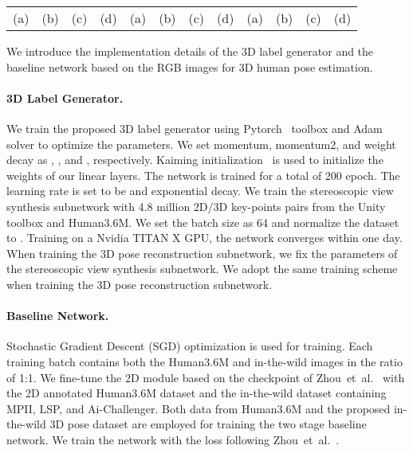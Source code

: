\documentclass[10pt,twocolumn,letterpaper]{article}
\def\etal{et~al.\xspace}
\begin{document}
\begin{figure*}[t]
\begin{center}
{\begin{tabular}{cccccccccccc}
 (a)& (b)& (c)& (d)& (a)& (b)& (c)& (d)& (a)& (b)& (c)& (d)\\
\end{tabular}}
\end{center}
\vspace{-2mm}
\caption{Qualitative evaluations on the in-the-wild images. (a) Original in-the-wild images, (b) Results of Martinez~\etal~\cite{martinez2017simple}, (c) Our results w/o geometric search scheme, (d) Our results w/ geometric search scheme. The proposed 3D label generator outperforms the method of Martinez~\etal~\cite{martinez2017simple}. The proposed geometric search scheme can refine the coarse 3D human pose. (All the predicted 3D poses are demonstrated from the front viewpoint.)}
\vspace{-4mm}
\label{exp:intro}
\end{figure*}


We introduce the implementation details of the 3D label generator and the baseline network based on the RGB images for 3D human pose estimation.
\paragraph{3D Label Generator.}\vspace{-4mm}
We train the proposed 3D label generator using Pytorch~\cite{pytorch} toolbox and Adam~\cite{kinga2015method} solver to optimize the parameters.
We set momentum, momentum2, and weight decay as , , and , respectively.
Kaiming initialization~\cite{he2015delving} is used to initialize the weights of our linear layers.
The network is trained for a total of 200 epoch.
The learning rate is set to be  and exponential decay.
We train the stereoscopic view synthesis subnetwork with 4.8 million 2D/3D key-points pairs from the Unity toolbox and Human3.6M.
We set the batch size as 64 and normalize the dataset to .
Training on a Nvidia TITAN X GPU, the network converges within one day.
When training the 3D pose reconstruction subnetwork, we fix the parameters of the stereoscopic view synthesis subnetwork. 
We adopt the same training scheme when training the 3D pose reconstruction subnetwork.
\paragraph{Baseline Network.}\vspace{-4mm}
Stochastic Gradient Descent (SGD) optimization is used for training.
Each training batch contains both the Human3.6M and in-the-wild images in the ratio of 1:1.
We fine-tune the 2D module based on the checkpoint of Zhou~\etal~\cite{zhou2017towards} with the 2D annotated Human3.6M dataset and the in-the-wild dataset containing MPII, LSP, and Ai-Challenger.
Both data from Human3.6M and the proposed in-the-wild 3D pose dataset are employed for training the two stage baseline network.
We train the network with the loss following Zhou~\etal~\cite{zhou2017towards}.
\end{document}
